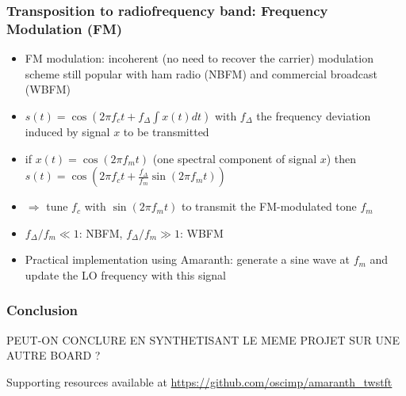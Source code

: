 \documentclass[compress,10pt,aspectratio=169]{beamer}
\begin{document}
\begin{frame}\frametitle{Transposition to radiofrequency band: Frequency Modulation (FM)}

\begin{itemize}
\item FM modulation: incoherent (no need to recover the carrier) modulation 
scheme still popular with ham radio (NBFM) and commercial broadcast (WBFM)
\item $s(t)=\cos(2\pi f_c t+f_\Delta \int x(t)dt)$ with $f_\Delta$ the
frequency deviation induced by signal $x$ to be transmitted
\item if $x(t)=\cos(2\pi f_m t)$ (one spectral component of signal $x$) then
$s(t)=\cos(2\pi f_c t+\frac{f_\Delta}{f_m}\sin(2\pi f_mt))$ 
\item $\Rightarrow$ tune $f_c$ with $\sin(2\pi f_mt)$ to transmit the 
FM-modulated tone $f_m$
\item $f_\Delta/f_m\ll 1$: NBFM, $f_\Delta/f_m\gg 1$: WBFM
\item Practical implementation using Amaranth: generate a sine wave at $f_m$
and update the LO frequency with this signal
\end{itemize}
\end{frame}

\begin{frame}\frametitle{Conclusion}

PEUT-ON CONCLURE EN SYNTHETISANT LE MEME PROJET SUR UNE AUTRE BOARD ?

Supporting resources available at
{\url{https://github.com/oscimp/amaranth_twstft}}
\end{frame}
\end{document}
